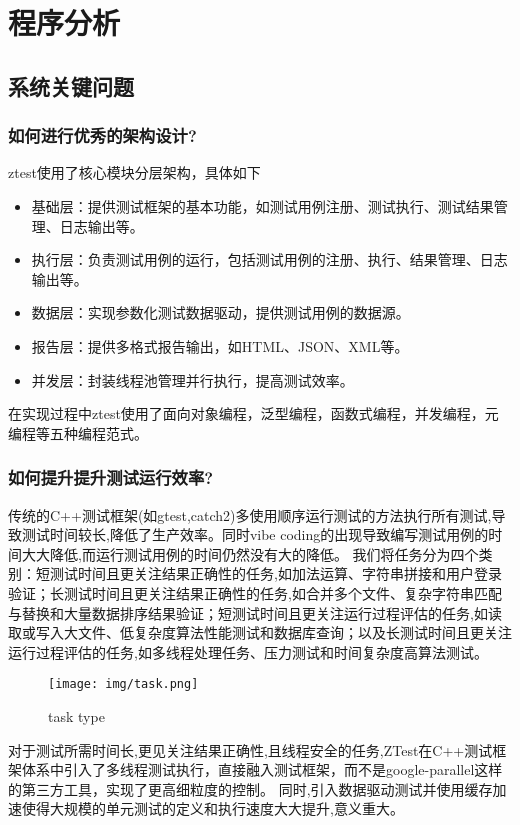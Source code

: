 \documentclass{article}
\begin{document}
\section{程序分析}
\subsection{ 系统关键问题}
\subsubsection{如何进行优秀的架构设计?}
ztest使用了核心模块分层架构，具体如下
\begin{itemize}
    \item 基础层：提供测试框架的基本功能，如测试用例注册、测试执行、测试结果管理、日志输出等。
    \item 执行层：负责测试用例的运行，包括测试用例的注册、执行、结果管理、日志输出等。
    \item 数据层：实现参数化测试数据驱动，提供测试用例的数据源。
    \item 报告层：提供多格式报告输出，如HTML、JSON、XML等。
    \item 并发层：封装线程池管理并行执行，提高测试效率。
\end{itemize}

在实现过程中ztest使用了面向对象编程，泛型编程，函数式编程，并发编程，元编程等五种编程范式。

\subsubsection{如何提升提升测试运行效率?}
传统的C++测试框架(如gtest,catch2)多使用顺序运行测试的方法执行所有测试,导致测试时间较长,降低了生产效率。同时vibe coding的出现导致编写测试用例的时间大大降低,而运行测试用例的时间仍然没有大的降低。
我们将任务分为四个类别：短测试时间且更关注结果正确性的任务,如加法运算、字符串拼接和用户登录验证；长测试时间且更关注结果正确性的任务,如合并多个文件、复杂字符串匹配与替换和大量数据排序结果验证；短测试时间且更关注运行过程评估的任务,如读取或写入大文件、低复杂度算法性能测试和数据库查询；以及长测试时间且更关注运行过程评估的任务,如多线程处理任务、压力测试和时间复杂度高算法测试。
\begin{figure}[H]
    \centering
    \texttt{[image: img/task.png]} %
    \caption{ task type}
    \label{fig:task types }
\end{figure}
对于测试所需时间长,更见关注结果正确性,且线程安全的任务,ZTest在C++测试框架体系中引入了多线程测试执行，直接融入测试框架，而不是google-parallel这样的第三方工具，实现了更高细粒度的控制。
同时,引入数据驱动测试并使用缓存加速使得大规模的单元测试的定义和执行速度大大提升,意义重大。
\end{document}
